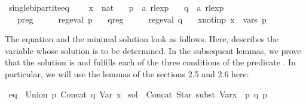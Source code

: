 \begin{isabellebody}
\isamarkupfalse%
\ single{\isacharunderscore}{\kern0pt}bipartite{\isacharunderscore}{\kern0pt}eq\ {\isacharequal}{\kern0pt}\isanewline
\ \ \ x\ {\isacharcolon}{\kern0pt}{\isacharcolon}{\kern0pt}\ {\isachardoublequoteopen}nat{\isachardoublequoteclose}\isanewline
\ \ \ p\ {\isacharcolon}{\kern0pt}{\isacharcolon}{\kern0pt}\ {\isachardoublequoteopen}{\isacharprime}{\kern0pt}a\ rlexp{\isachardoublequoteclose}\isanewline
\ \ \ q\ {\isacharcolon}{\kern0pt}{\isacharcolon}{\kern0pt}\ {\isachardoublequoteopen}{\isacharprime}{\kern0pt}a\ rlexp{\isachardoublequoteclose}\isanewline
\ \ \ p{\isacharunderscore}{\kern0pt}reg{\isacharcolon}{\kern0pt}\ \ \ \ \ \ {\isachardoublequoteopen}reg{\isacharunderscore}{\kern0pt}eval\ p{\isachardoublequoteclose}\isanewline
\ \ \ q{\isacharunderscore}{\kern0pt}reg{\isacharcolon}{\kern0pt}\ \ \ \ \ \ {\isachardoublequoteopen}reg{\isacharunderscore}{\kern0pt}eval\ q{\isachardoublequoteclose}\isanewline
\ \ \ x{\isacharunderscore}{\kern0pt}not{\isacharunderscore}{\kern0pt}in{\isacharunderscore}{\kern0pt}p{\isacharcolon}{\kern0pt}\ {\isachardoublequoteopen}x\ {\isasymnotin}\ vars\ p{\isachardoublequoteclose}\isanewline
{}%
\begin{isamarkuptext}%
The equation and the minimal solution look as follows. Here,  describes the variable whose
solution is to be determined. In the subsequent lemmas, we prove that the solution is 
and fulfills each of the three conditions of the predicate .
In particular, we will use the lemmas of the sections 2.5 and 2.6 here:%
\end{isamarkuptext}\isamarkuptrue%
\isamarkupfalse%
\ {\isachardoublequoteopen}eq\ {\isasymequiv}\ Union\ p\ {\isacharparenleft}{\kern0pt}Concat\ q\ {\isacharparenleft}{\kern0pt}Var\ x{\isacharparenright}{\kern0pt}{\isacharparenright}{\kern0pt}{\isachardoublequoteclose}\isanewline
{}\isamarkupfalse%
\ {\isachardoublequoteopen}sol\ {\isasymequiv}\ Concat\ {\isacharparenleft}{\kern0pt}Star\ {\isacharparenleft}{\kern0pt}subst\ {\isacharparenleft}{\kern0pt}Var{\isacharparenleft}{\kern0pt}x\ {\isacharcolon}{\kern0pt}{\isacharequal}{\kern0pt}\ p{\isacharparenright}{\kern0pt}{\isacharparenright}{\kern0pt}\ q{\isacharparenright}{\kern0pt}{\isacharparenright}{\kern0pt}\ p{\isachardoublequoteclose}\isanewline

\end{isabellebody}
